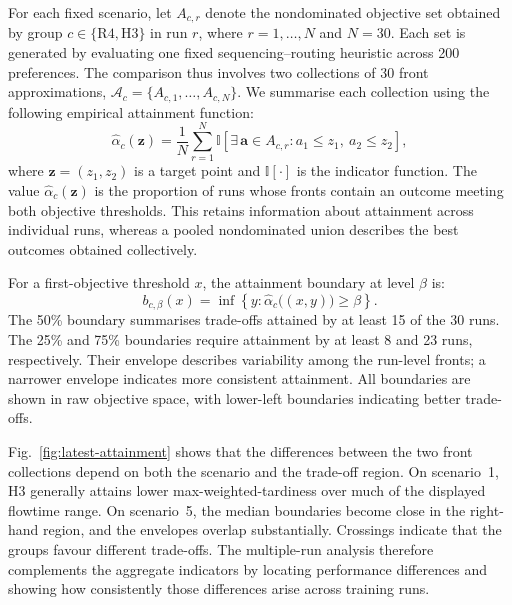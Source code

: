 \documentclass[10pt,journal]{IEEEtran}
\begin{document}
For each fixed scenario, let $A_{c,r}$ denote the nondominated objective set obtained by group $c\in\{\mathrm{R4},\mathrm{H3}\}$ in run $r$, where $r=1,\ldots,N$ and $N=30$. Each set is generated by evaluating one fixed sequencing--routing heuristic across 200 preferences. The comparison thus involves two collections of 30 front approximations, $\mathcal{A}_c=\{A_{c,1},\ldots,A_{c,N}\}$. We summarise each collection using the following empirical attainment function:
\begin{equation}
\widehat{\alpha}_c(\mathbf{z})
=
\frac{1}{N}\sum_{r=1}^{N}
\mathbb{I}\!\left[
\exists\,\mathbf{a}\in A_{c,r}:
a_1\leq z_1,\ a_2\leq z_2
\right],
\label{eq:empirical-attainment}
\end{equation}
where $\mathbf{z}=(z_1,z_2)$ is a target point and $\mathbb{I}[\cdot]$ is the indicator function. The value $\widehat{\alpha}_c(\mathbf{z})$ is the proportion of runs whose fronts contain an outcome meeting both objective thresholds. This retains information about attainment across individual runs, whereas a pooled nondominated union describes the best outcomes obtained collectively.

For a first-objective threshold $x$, the attainment boundary at level $\beta$ is:
\begin{equation}
b_{c,\beta}(x)
=
\inf\left\{y:
\widehat{\alpha}_c\bigl((x,y)\bigr)\geq\beta
\right\}.
\label{eq:attainment-boundary}
\end{equation}
The 50\% boundary summarises trade-offs attained by at least 15 of the 30 runs. The 25\% and 75\% boundaries require attainment by at least 8 and 23 runs, respectively. Their envelope describes variability among the run-level fronts; a narrower envelope indicates more consistent attainment. All boundaries are shown in raw objective space, with lower-left boundaries indicating better trade-offs.

Fig.~\ref{fig:latest-attainment} shows that the differences between the two front collections depend on both the scenario and the trade-off region. On scenario~1, H3 generally attains lower max-weighted-tardiness over much of the displayed flowtime range. On scenario~5, the median boundaries become close in the right-hand region, and the envelopes overlap substantially. Crossings indicate that the groups favour different trade-offs. The multiple-run analysis therefore complements the aggregate indicators by locating performance differences and showing how consistently those differences arise across training runs.
\end{document}
